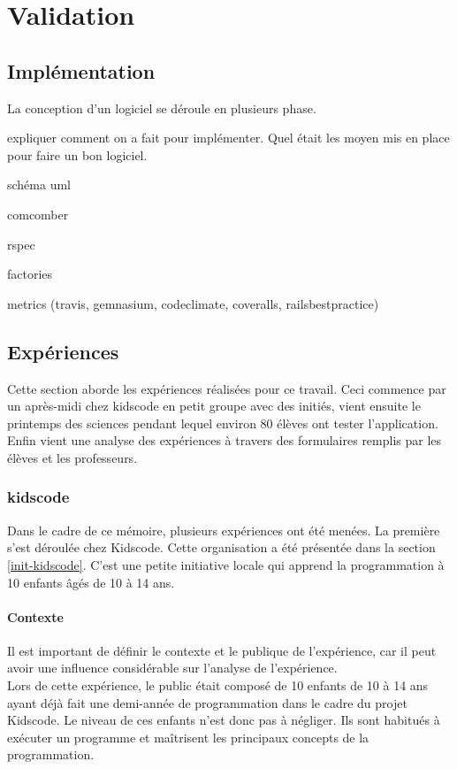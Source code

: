 \chapter{Validation}

\section{Implémentation}
La conception d'un logiciel se déroule en plusieurs phase.



expliquer comment on a fait pour implémenter. Quel était les moyen mis en place pour faire un bon logiciel.

schéma uml

comcomber

rspec

factories

metrics (travis, gemnasium, codeclimate, coveralls, railsbestpractice)

\section{Expériences}
Cette section aborde les expériences réalisées pour ce travail. Ceci commence par un après-midi chez kidscode en petit groupe avec des initiés, vient ensuite le printemps des sciences pendant lequel environ 80 élèves ont tester l'application. Enfin vient une analyse des expériences à travers des formulaires remplis par les élèves et les professeurs.
\subsection{kidscode}
\label{kidscode}
Dans le cadre de ce mémoire, plusieurs expériences ont été menées. La première s'est déroulée chez Kidscode. Cette organisation a été présentée dans la section \ref{init-kidscode}. C'est une petite initiative locale qui apprend la programmation à 10 enfants âgés de 10 à 14 ans.

\subsubsection{Contexte}
\label{context-kidscode}
Il est important de définir le contexte et le publique de l'expérience, car il peut avoir une influence considérable sur l'analyse de l'expérience.\\

Lors de cette expérience, le public était composé de 10 enfants de 10 à 14 ans ayant déjà fait une demi-année de programmation dans le cadre du projet Kidscode. Le niveau de ces enfants n'est donc pas à négliger. Ils sont habitués à exécuter un programme et maîtrisent les principaux concepts de la programmation.\\

